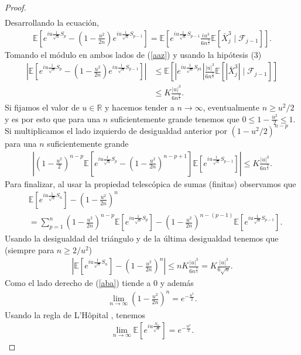 \begin{proof}
\begin{align*}
	\end{align*}
Desarrollando la ecuación,
	\begin{align}
	\mathbb{E}\left[e^{iu \frac{1}{\sqrt{n}} S_p} - \left(1 - \frac{u^2}{2n}\right)e^{iu \frac{1}{\sqrt{n}} S_{p-1}}\right] = \mathbb{E}\left[e^{iu \frac{1}{\sqrt{n}} S_{p-1}} \frac{iu^3}{6n^{\frac{3}{2}}} \mathbb{E}[\bar{X}_j^3 \mid \mathcal{F}_{j-1}] \right]. \label{aaz}
	\end{align}
Tomando el módulo en ambos lados de (\ref{aaz}) y usando la hipótesis (3)
	\begin{align*}
	\left| \mathbb{E} \left[e^{iu \frac{1}{\sqrt{n}} S_p} - \left(1 - \frac{u^2}{2n}\right) e^{iu \frac{1}{\sqrt{n}} S_{p-1}} \right]\right| & \leq \mathbb{E} \left[ | e^{iu \frac{1}{\sqrt{n}} S_{p1}} | \frac{|u|^3}{6n^{\frac{3}{2}}} \mathbb{E}[| \bar{X}_j^3 | \mid \mathcal{F}_{j-1}] \right] \\
	& \leq K \frac{|u|^3}{6n^{\frac{3}{2}}}.
	\end{align*} 
Si fijamos el valor de $u \in \mathbb{R}$ y hacemos tender a $n \rightarrow \infty$, eventualmente $n \geq u^2/2$ y es por esto que para una $n$ suficientemente grande tenemos que $0 \leq 1 - \frac{u^2}{2} \leq 1$. Si multiplicamos el lado izquierdo de desigualdad anterior por $(1 - u^2/2)^{n-p}$ para una $n$ suficientemente grande
	\begin{align*}
	\left| \left(1 - \frac{u^2}{2}\right)^{n-p} \mathbb{E} \left[e^{iu \frac{1}{\sqrt{n}} S_p} - \left(1 - \frac{u^2}{2n}\right)^{n-p+1}\right]\mathbb{E}\left[e^{iu \frac{1}{\sqrt{n}} S_{p-1}} \right] \right| \leq K \frac{|u|^3}{6n^{\frac{3}{2}}}.
	\end{align*}
Para finalizar, al usar la propiedad telescópica de sumas (finitas) observamos que 
	\begin{align*}
	& \mathbb{E} \left[e^{iu \frac{1}{\sqrt{n}} S_n} \right] - \left(1 - \frac{u^2}{2n}\right)^{n} \\ 
	& = \sum_{p=1}^{n} \left(1 - \frac{u^2}{2n}\right)^{n-p} \mathbb{E} \left[e^{iu \frac{1}{\sqrt{n}} S_p} \right] - \left(1 - \frac{u^2}{2n}\right)^{n-(p-1)} \mathbb{E} \left[e^{iu \frac{1}{\sqrt{n}} S_{p-1}} \right].
	\end{align*}
Usando la desigualdad del triángulo y de la última desigualdad tenemos que (siempre para $n \geq 2/u^2$)
	\begin{align}
	\left| \mathbb{E} \left[e^{iu \frac{1}{\sqrt{n}} S_n} \right] - \left(1 - \frac{u^2}{2n}\right)^{n} \right| \leq n K \frac{|u|^3}{6n^{\frac{3}{2}}} = K \frac{|u|^3}{6\sqrt{n}}. \label{aba}
	\end{align}
Como el lado derecho de (\ref{aba}) tiende a $0$ y además
	\begin{align}
	\lim_{n \rightarrow \infty} \left(1 - \frac{u^2}{2n}\right)^{n} = e^{-\frac{u^2}{2}}.
	\end{align}
Usando la regla de L'Hôpital \cite[p.~215]{bartle}, tenemos
	\begin{align}
	\lim_{n \rightarrow \infty}\mathbb{E} \left[e^{iu \frac{S_n}{\sqrt{n}}} \right] = e^{-\frac{u^2}{2}}.
	\end{align}


\end{proof}

